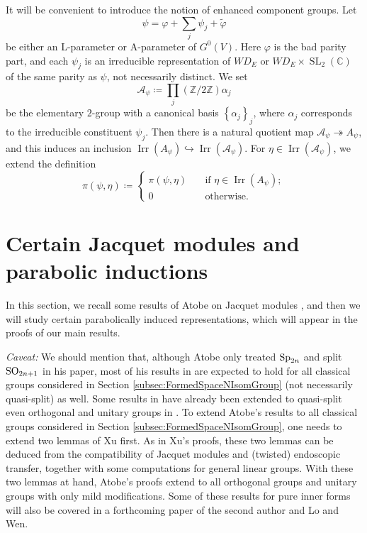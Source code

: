 \documentclass[11pt,letterpaper]{amsart}
\theoremstyle{plain}
\numberwithin{theorem}{section}
\numberwithin{equation}{subsection}
\theoremstyle{remark}
\newcommand{\SL}{\operatorname{SL}}
\newcommand{\Irr}{\operatorname{Irr}}
\newcommand{\C}{\mathbb{C}}
\newcommand{\Z}{\mathbb{Z}}
\def\calA{\mathcal{A}}
\begin{document}
\vskip 5pt

It will be convenient to introduce the notion of enhanced component groups. Let
\[
    \psi = \varphi + \sum_j \psi_j + \widetilde{\varphi}
\]
be either an L-parameter or A-parameter of $G^0(V)$. Here $\varphi$ is the bad parity part, and each $\psi_j$ is an irreducible representation of $WD_E$ or $WD_E\times\SL_2(\C)$ of the same parity as $\psi$, not necessarily distinct. We set
\[
    \calA_\psi \coloneqq \prod_{j} \left(\Z/2\Z\right) \alpha_j
\]
be the elementary $2$-group with a canonical basis $\left\{\alpha_j\right\}_j$, where $\alpha_j$ corresponds to the irreducible constituent $\psi_j$. Then there is a natural quotient map $\calA_\psi\twoheadrightarrow A_\psi$, and this induces an inclusion $\Irr\left(A_\psi\right)\hookrightarrow \Irr\left(\calA_\psi\right)$. For $\eta\in\Irr\left(\calA_\psi\right)$, we extend the definition
\[
    \pi\left(\psi,\eta\right) \coloneqq \begin{cases}
        \pi\left(\psi,\eta\right) \quad & \text{if }\eta\in\Irr\left(A_\psi\right);\\
        0 \quad & \text{otherwise}.
    \end{cases}
\]

\vskip 10pt



\section{Certain Jacquet modules and parabolic inductions} %
\label{sec:certain_jacquet_modules_and_parabolic_inductions}

In this section, we recall some results of Atobe on Jacquet modules \cite{MR4055180}, and then we will study certain parabolically induced representations, which will appear in the proofs of our main results.

\vskip 5pt

\emph{Caveat:} We should mention that, although Atobe only treated ${\rm Sp}_{2n}$ and split ${\rm SO}_{2n+1}$ in his paper, most of his results in \cite{MR4055180} are expected to hold for all classical groups considered in Section \ref{subsec:FormedSpaceNIsomGroup} (not necessarily quasi-split) as well. Some results in \cite{MR4055180} have already been extended to quasi-split even orthogonal and unitary groups in \cite[App. C]{atobe2024local}. %
To extend Atobe's results to all classical groups considered in Section \ref{subsec:FormedSpaceNIsomGroup}, one needs to extend two lemmas of Xu \cite[Lem. 7.2, Lem. 7.3]{MR3713922} first. As in Xu's proofs, these two lemmas can be deduced from the compatibility of Jacquet modules and (twisted) endoscopic transfer, together with some computations for general linear groups. With these two lemmas at hand, Atobe's proofs extend to all orthogonal groups and unitary groups with only mild modifications. Some of these results for pure inner forms will also be covered in a forthcoming paper \cite{clw26} of the second author and Lo and Wen. 
\end{document}
